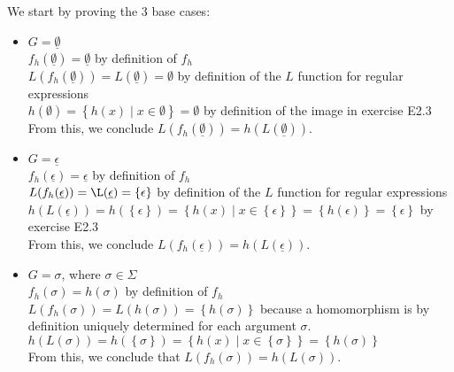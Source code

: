 We start by proving the 3 base cases:\\
\begin{itemize}
    \item $G=\underline{\emptyset}$\\
    $f_{h}(\underline{\emptyset}) = \underline{\emptyset}$ by definition of $f_{h}$\\
    $L(f_{h}(\underline{\emptyset})) = L(\underline{\emptyset}) = \emptyset$ by definition of the $L$ function for regular expressions\\
    $h(\emptyset) = \left\{h(x) \mid x\in \emptyset \right\} = \emptyset$ by definition of the image in exercise E2.3\\
    From this, we conclude $L(f_{h}(\underline{\emptyset})) = h(L(\underline{\emptyset}))$.\\
    \item $G=\underline{\epsilon}$\\
    $f_{h}(\underline{\epsilon}) = \underline{\epsilon}$ by definition of $f_{h}$\\
    $L(f_{h}(\underline{\epsilon})) = \L(\underline{\epsilon}) = \left\{ \epsilon \right\}$ by definition of the $L$ function for regular expressions\\
    $h(L(\underline{\epsilon})) = h(\left\{\epsilon\right\}) = \left\{h(x)\mid x\in \left\{\epsilon\right\} \right\} = \left\{ h(\epsilon) \right\} = \left\{\epsilon\right\}$ by exercise E2.3\\
    From this, we conclude $L(f_{h}(\underline{\epsilon})) = h(L(\underline{\epsilon}))$.\\
    \item $G=\sigma$, where $\sigma \in \Sigma$\\
    $f_{h}(\sigma) = h(\sigma)$ by definition of $f_{h}$\\
    $L(f_{h}(\sigma)) = L(h(\sigma)) = \left\{ h(\sigma) \right\}$ because a homomorphism is by definition uniquely determined for each argument $\sigma$.\\
    $h(L(\sigma)) = h(\left\{\sigma\right\}) = \left\{ h(x) \mid x\in \left\{ \sigma \right\} \right\} = \left\{h(\sigma)\right\}$\\
    From this, we conclude that $L(f_{h}(\sigma)) = h(L(\sigma))$.\\
\end{itemize}

